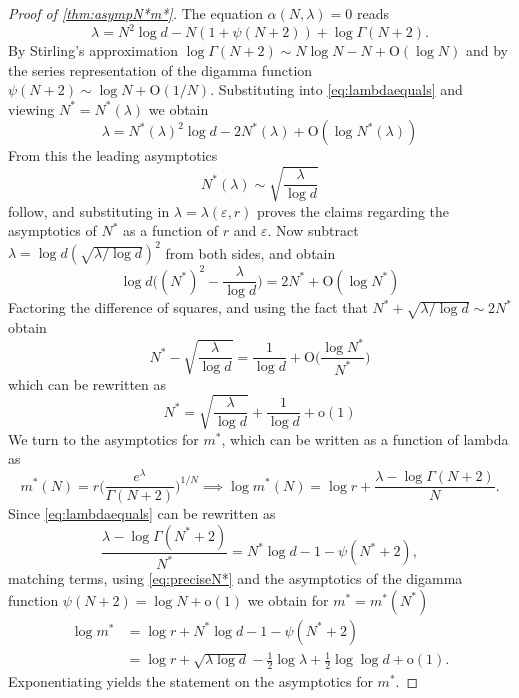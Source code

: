 \documentclass{article}
\def\eps{\varepsilon}
\numberwithin{equation}{section}
\theoremstyle{definition}
\theoremstyle{remark}
\begin{document}
\begin{proof}[Proof of \autoref{thm:asympN*m*}]
The equation $\alpha(N, \lambda) = 0$ reads
\begin{equation}\label{eq:lambdaequals}
\lambda = N^2 \log d - N(1 + \psi(N+2)) + \log \Gamma(N+2).
\end{equation}
By Stirling's approximation $\log \Gamma(N+2)  \sim N\log N - N + \mathrm{O}(\log N)$ and by the series representation of the digamma function \cite[(6.3.18)]{handbook} $\psi(N+2) \sim \log N + \mathrm{O}(1/N)$. Substituting into \eqref{eq:lambdaequals} and viewing $N^* = N^*(\lambda)$ we obtain
\begin{equation}\label{eq:lambdaequals2}
\lambda = N^*(\lambda)^2 \log d - 2N^*(\lambda) + \mathrm{O}(\log N^*(\lambda))
\end{equation}
From this the leading asymptotics
\[
N^*(\lambda) \sim \sqrt{\frac{\lambda}{\log d}}
\]
follow, and substituting in $\lambda = \lambda(\eps,r)$ proves the claims regarding the asymptotics of $N^*$ as a function of $r$ and $\eps$. Now subtract $\lambda = \log d (\sqrt{\lambda/\log d})^2$ from both sides, and obtain
\[
\log d \bigg( (N^*)^2 - \frac{\lambda}{\log d} \bigg) = 2N^* + \mathrm{O}(\log N^*)
\]
Factoring the difference of squares, and using the fact that $N^* + \sqrt{\lambda/\log d} \sim 2N^*$ obtain
\[
N^* - \sqrt{\frac{\lambda}{\log d}} = \frac{1}{\log d} + \mathrm{O}\bigg(\frac{\log N^*}{N^*} \bigg)
\]
which can be rewritten as
\begin{equation}\label{eq:preciseN*}
N^* = \sqrt{\frac{\lambda}{\log d}} + \frac{1}{\log d} + \mathrm{o}(1)
\end{equation}
We turn to the asymptotics for $m^*$, which can be written as a function of lambda as
\[
m^*(N) = r \bigg( \frac{e^\lambda}{\Gamma(N+2)} \bigg)^{1/N} \implies \log m^*(N) = \log r + \frac{\lambda - \log \Gamma(N+2)}{N}.
\]
Since \eqref{eq:lambdaequals} can be rewritten as
\[
\frac{\lambda - \log \Gamma(N^*+2)}{N^*} = N^*\log d - 1 - \psi(N^*+2),
\]
matching terms, using \eqref{eq:preciseN*} and the asymptotics of the digamma function \cite[(6.3.18)]{handbook} $\psi(N+2) = \log N + \mathrm{o}(1)$ we obtain for $m^* = m^*(N^*)$
\begin{align*}
\log m^*
&= \log r + N^*\log d - 1 - \psi(N^*+2) \\
&= \log r + \sqrt{\lambda \log d} - \frac 12 \log \lambda + \frac 12 \log \log d + \mathrm{o}(1).
\end{align*}
Exponentiating yields the statement on the asymptotics for $m^*$.
\end{proof}
\end{document}
